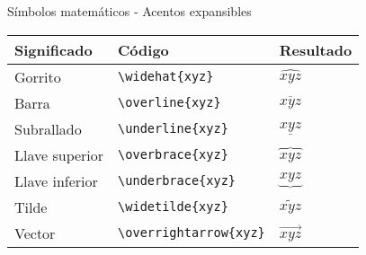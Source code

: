 \documentclass[
  ignorenonframetext,
]{beamer}
\begin{document}
\begin{frame}[fragile]{Símbolos matemáticos - Acentos expansibles}
\protect\hypertarget{suxedmbolos-matemuxe1ticos---acentos-expansibles}{}

\begin{longtable}[]{@{}lll@{}}
\toprule
Significado & Código & Resultado\tabularnewline
\midrule
\endhead
Gorrito & \texttt{\textbackslash{}widehat\{xyz\}} &
\(\widehat{xyz}\)\tabularnewline
Barra & \texttt{\textbackslash{}overline\{xyz\}} &
\(\overline{xyz}\)\tabularnewline
Subrallado & \texttt{\textbackslash{}underline\{xyz\}} &
\(\underline{xyz}\)\tabularnewline
Llave superior & \texttt{\textbackslash{}overbrace\{xyz\}} &
\(\overbrace{xyz}\)\tabularnewline
Llave inferior & \texttt{\textbackslash{}underbrace\{xyz\}} &
\(\underbrace{xyz}\)\tabularnewline
Tilde & \texttt{\textbackslash{}widetilde\{xyz\}} &
\(\widetilde{xyz}\)\tabularnewline
Vector & \texttt{\textbackslash{}overrightarrow\{xyz\}} &
\(\overrightarrow{xyz}\)\tabularnewline
\bottomrule
\end{longtable}

\end{frame}
\end{document}
